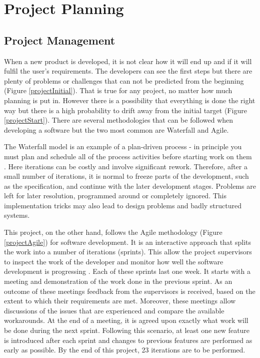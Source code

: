 \documentclass{l4proj}
\begin{document}
\chapter{Project Planning}

\section{Project Management}

When a new product is developed, it is not clear how it will end up and if it will fulfil the user's requirements. The developers can see the first steps but there are plenty of problems or challenges that can not be predicted from the beginning (Figure \ref{projectInitial}). That is true for any project, no matter how much planning is put in. However there is a possibility that everything is done the right way but there is a high probability to drift away from the initial target (Figure \ref{projectStart}). There are several methodologies that can be followed when developing a software but the two most common are Waterfall and Agile. 

The Waterfall model is an example of a plan-driven process - in principle you must plan and schedule all of the process activities before starting work on them \cite{sene}. Here iterations can be costly and involve significant rework. Therefore, after a small number of iterations, it is normal to freeze parts of the development, such as the specification, and continue with the later development stages. Problems are left for later resolution, programmed around or completely ignored. This implementation tricks may also lead to design problems and badly structured systems.

This project, on the other hand, follows the Agile methodology (Figure \ref{projectAgile}) for software development. It is an interactive
approach that splits the work into a number of iterations (sprints). This allow the project supervisors to inspect the work of the developer and monitor how well the software development is progressing \cite{sene}. Each of these sprints last one
week. It starts with a meeting and demonstration of the work done in the previous sprint. As an
outcome of these meetings feedback from the supervisors is received, based on the
extent to which their requirements are met. Moreover, these meetings allow discussions of the issues
that are experienced and compare the available workarounds. At the end of a meeting, it is agreed
upon exactly what work will be done during the next sprint. Following this scenario, at least one new
feature is introduced after each sprint and changes to previous features are performed as early as possible. By the end of this project, 23 iterations are to be performed.
\end{document}
